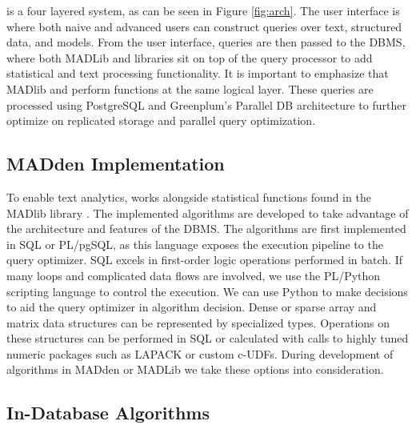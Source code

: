 {\system} is a four layered system, as can be seen in Figure \ref{fig:arch}.
The user interface is where both naive and advanced users can construct queries over
text, structured data, and models. From the user interface, queries are then passed to the
DBMS, where both MADLib and {\system} libraries sit on top of the query processor to
add statistical and text processing functionality. 
It is important to emphasize that MADlib and {\system} perform functions
at the same logical layer.  These queries are processed using 
PostgreSQL and Greenplum's Parallel DB architecture to further optimize on 
replicated storage and parallel query optimization. 









\subsection{MADden Implementation}
To enable text analytics, {\system} works alongside statistical
functions found in the MADlib library \cite{Cohen:2009:MSN:1687553.1687576}.
The implemented algorithms are developed to take advantage of the 
architecture and features of the DBMS.
The algorithms are first implemented in SQL or PL/pgSQL, as this language
exposes the execution pipeline to the query optimizer. 
SQL excels in first-order logic operations performed in batch.
If many loops and complicated data flows are involved, we use the PL/Python 
scripting language to control the execution.
We can use Python to make decisions to aid the query optimizer in algorithm
decision.
Dense or sparse array and matrix data structures can be represented
by specialized types. Operations on these structures can be performed in
SQL or calculated with calls to highly tuned numeric packages such as LAPACK
or custom c-UDFs.
During development of algorithms in MADden or MADLib we take these options 
into consideration.


\subsection{In-Database Algorithms}

